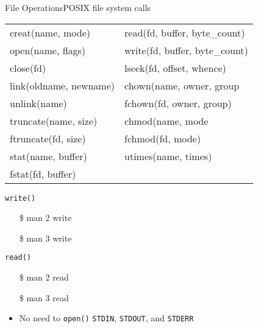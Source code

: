 \begin{frame}{File Operations}{POSIX file system calls}%
  \ttfamily
  \begin{tabular}{l|l}
    creat(name, mode)&read(fd, buffer, byte\_count)\\
    open(name, flags)&write(fd, buffer, byte\_count)\\
    close(fd)&lseek(fd, offset, whence)\\
    link(oldname, newname)&chown(name, owner, group\\
    unlink(name)&fchown(fd, owner, group)\\        
    truncate(name, size)&chmod(name, mode\\
    ftruncate(fd, size)&fchmod(fd, mode)\\
    stat(name, buffer)&utimes(name, times)\\
    fstat(fd, buffer)&\\
  \end{tabular}
\end{frame}

\begin{frame}
  \begin{minipage}[t]{.5\linewidth}
    \begin{block}{\texttt{write()}}
      \centering
    \end{block}
    \ttfamily
    \begin{itemize}
    \item[\$] man 2 write
    \item[\$] man 3 write
    \end{itemize}
  \end{minipage}\qquad
  \begin{minipage}[t]{.35\linewidth}
    \begin{block}{\texttt{read()}}
      \centering
    \end{block}
    \ttfamily
    \begin{itemize}
    \item[\$] man 2 read
    \item[\$] man 3 read
    \end{itemize}
  \end{minipage}
  \vspace*{1em}
  \begin{itemize}
  \item No need to \texttt{open()} \texttt{STDIN}, \texttt{STDOUT}, and \texttt{STDERR}
  \end{itemize}
\end{frame}

